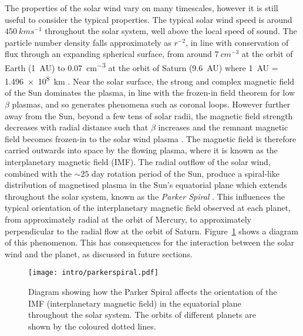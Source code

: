 The properties of the solar wind vary on many timescales, however it is still useful to consider the typical properties. The typical solar wind speed is around $\SI{450}{kms^{-1}}$ throughout the solar system, well above the local speed of sound. The particle number density falls approximately as $r^{-2}$, in line with conservation of flux through an expanding spherical surface, from around $\SI{7}{cm^{-3}}$ at the orbit of Earth (\SI{1}{AU}) to \SI{0.07}{cm^{-3}} at the orbit of Saturn (\SI{9.6}{AU}) where \SI{1}{AU} = \SI{1.496e8}{km} \citep{bagenal2014} . Near the solar surface, the strong and complex magnetic field of the Sun dominates the plasma, in line with the frozen-in field theorem for low $\beta$ plasmas, and so generates phenomena such as coronal loops. However further away from the Sun, beyond a few tens of solar radii, the magnetic field strength decreases with radial distance such that $\beta$ increases and the remnant magnetic field becomes frozen-in to the solar wind plasma \citep{russell2016}. The magnetic field is therefore carried outwards into space by the flowing plasma, where it is known as the interplanetary magnetic field (IMF). The radial outflow of the solar wind, combined with the ${\sim}25$ day rotation period of the Sun, produce a spiral-like distribution of magnetised plasma in the Sun's equatorial plane which extends throughout the solar system, known as the \textit{Parker Spiral} \citep{parker1958}. This influences the typical orientation of the interplanetary magnetic field observed at each planet, from approximately radial at the orbit of Mercury, to approximately perpendicular to the radial flow at the orbit of Saturn. Figure~\ref{intro:fig:parkerspiral} shows a diagram of this phenomenon. This has consequences for the interaction between the solar wind and the planet, as discussed in future sections.

\begin{figure}
\centering
\noindent\texttt{[image: intro/parkerspiral.pdf]}
\caption[Diagram of the Parker Spiral throughout the solar system.]{Diagram showing how the Parker Spiral affects the orientation of the IMF (interplanetary magnetic field) in the equatorial plane throughout the solar system. The orbits of different planets are shown by the coloured dotted lines.}
\label{intro:fig:parkerspiral}
\end{figure}

